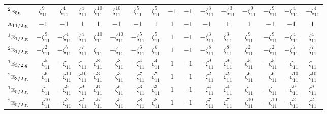 \documentclass[10pt,a4paper]{article}
\makeatletter
\def\grouprule#1#2{\noalign{\marks\LTgroupmarks{\the\belowrulesep}\nobreak\vskip#1%
  \vskip\aboverulesep}\multispan\LT@cols\unskip{\leaders\hrule\@height#2\hfill\kern\z@}\cr
  \noalign{\penalty\LTrulebreak\vskip\belowrulesep\global\@lastruleclass\z@}}
\numberwithin{equation}{section}
\newcommand{\irr}[1]{\text{\normalfont\scshape #1}}
\newcommand{\conjpair}[1]{{}^{#1}}
\newcommand{\ptag}[1]{\mathrm{#1}}
\newcommand{\rootunity}[1]{\zeta_{#1}}
\makeatother
\begin{document}
{\begin{longtable}{@{}lccccccccccccccc@{}}
$\conjpair{2}\irr{e}_{5\ptag{u}}$ & $\rootunity{11}^{9}$ & $\rootunity{11}^{4}$ & $\rootunity{11}^{4}$ & $\rootunity{11}^{10}$ & $\rootunity{11}^{10}$ & $\rootunity{11}^{5}$ & $\rootunity{11}^{5}$ & $-1$ & $-1$ & $-\rootunity{11}^{3}$ & $-\rootunity{11}^{3}$ & $-\rootunity{11}^{9}$ & $-\rootunity{11}^{9}$ & $-\rootunity{11}^{4}$ & $-\rootunity{11}^{4}$\\
\grouprule{0pt}{\lightrulewidth}
$\irr{a}_{11/2,\ptag{g}}$ & $-1$ & $-1$ & $1$ & $1$ & $-1$ & $-1$ & $1$ & $1$ & $-1$ & $-1$ & $1$ & $1$ & $-1$ & $-1$ & $1$\\
$\conjpair{1}\irr{e}_{1/2,\ptag{g}}$ & $-\rootunity{11}^{9}$ & $-\rootunity{11}^{4}$ & $\rootunity{11}^{4}$ & $\rootunity{11}^{10}$ & $-\rootunity{11}^{10}$ & $-\rootunity{11}^{5}$ & $\rootunity{11}^{5}$ & $1$ & $-1$ & $-\rootunity{11}^{3}$ & $\rootunity{11}^{3}$ & $\rootunity{11}^{9}$ & $-\rootunity{11}^{9}$ & $-\rootunity{11}^{4}$ & $\rootunity{11}^{4}$\\
$\conjpair{2}\irr{e}_{1/2,\ptag{g}}$ & $-\rootunity{11}^{2}$ & $-\rootunity{11}^{7}$ & $\rootunity{11}^{7}$ & $\rootunity{11}$ & $-\rootunity{11}$ & $-\rootunity{11}^{6}$ & $\rootunity{11}^{6}$ & $1$ & $-1$ & $-\rootunity{11}^{8}$ & $\rootunity{11}^{8}$ & $\rootunity{11}^{2}$ & $-\rootunity{11}^{2}$ & $-\rootunity{11}^{7}$ & $\rootunity{11}^{7}$\\
$\conjpair{1}\irr{e}_{3/2,\ptag{g}}$ & $-\rootunity{11}^{5}$ & $-\rootunity{11}$ & $\rootunity{11}$ & $\rootunity{11}^{8}$ & $-\rootunity{11}^{8}$ & $-\rootunity{11}^{4}$ & $\rootunity{11}^{4}$ & $1$ & $-1$ & $-\rootunity{11}^{9}$ & $\rootunity{11}^{9}$ & $\rootunity{11}^{5}$ & $-\rootunity{11}^{5}$ & $-\rootunity{11}$ & $\rootunity{11}$\\
$\conjpair{2}\irr{e}_{3/2,\ptag{g}}$ & $-\rootunity{11}^{6}$ & $-\rootunity{11}^{10}$ & $\rootunity{11}^{10}$ & $\rootunity{11}^{3}$ & $-\rootunity{11}^{3}$ & $-\rootunity{11}^{7}$ & $\rootunity{11}^{7}$ & $1$ & $-1$ & $-\rootunity{11}^{2}$ & $\rootunity{11}^{2}$ & $\rootunity{11}^{6}$ & $-\rootunity{11}^{6}$ & $-\rootunity{11}^{10}$ & $\rootunity{11}^{10}$\\
$\conjpair{1}\irr{e}_{5/2,\ptag{g}}$ & $-\rootunity{11}$ & $-\rootunity{11}^{9}$ & $\rootunity{11}^{9}$ & $\rootunity{11}^{6}$ & $-\rootunity{11}^{6}$ & $-\rootunity{11}^{3}$ & $\rootunity{11}^{3}$ & $1$ & $-1$ & $-\rootunity{11}^{4}$ & $\rootunity{11}^{4}$ & $\rootunity{11}$ & $-\rootunity{11}$ & $-\rootunity{11}^{9}$ & $\rootunity{11}^{9}$\\
$\conjpair{2}\irr{e}_{5/2,\ptag{g}}$ & $-\rootunity{11}^{10}$ & $-\rootunity{11}^{2}$ & $\rootunity{11}^{2}$ & $\rootunity{11}^{5}$ & $-\rootunity{11}^{5}$ & $-\rootunity{11}^{8}$ & $\rootunity{11}^{8}$ & $1$ & $-1$ & $-\rootunity{11}^{7}$ & $\rootunity{11}^{7}$ & $\rootunity{11}^{10}$ & $-\rootunity{11}^{10}$ & $-\rootunity{11}^{2}$ & $\rootunity{11}^{2}$\\

\end{longtable}}
\end{document}
